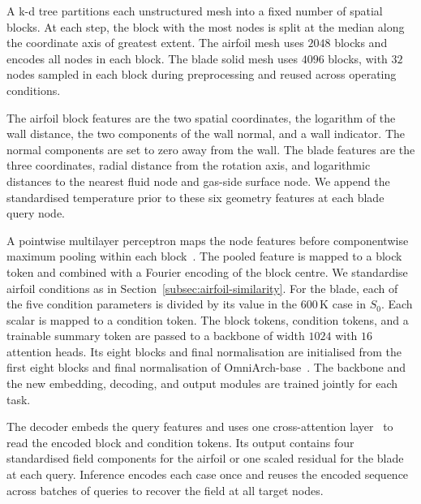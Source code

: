 \documentclass[a4paper,fleqn]{cas-sc}
\begin{document}
A k-d tree partitions each unstructured mesh into a fixed number of spatial blocks.
At each step, the block with the most nodes is split at the median along the coordinate
axis of greatest extent. The airfoil mesh uses $2048$ blocks and encodes all nodes
in each block. The blade solid mesh uses $4096$ blocks, with $32$ nodes sampled in each
block during preprocessing and reused across operating conditions.

The airfoil block features are the two spatial coordinates, the logarithm of the wall
distance, the two components of the wall normal, and a wall indicator. The normal
components are set to zero away from the wall. The blade features are the three
coordinates, radial distance from the rotation axis, and logarithmic distances to
the nearest fluid node and gas-side surface node. We append the standardised
temperature prior to these six geometry features at each blade query node.

A pointwise multilayer perceptron maps the node features before componentwise maximum
pooling within each block~\citep{Qi2017PointNet}. The pooled feature is mapped to a block token and combined
with a Fourier encoding of the block centre. We standardise airfoil conditions as in
Section~\ref{subsec:airfoil-similarity}. For the blade, each of the five condition
parameters is divided by its value in the $600\,\mathrm{K}$ case in $S_0$. Each scalar
is mapped to a condition token. The block tokens, condition tokens, and a trainable
summary token are passed to a backbone of width $1024$ with $16$ attention heads.
Its eight blocks and final normalisation are initialised from the first eight blocks
and final normalisation of OmniArch-base~\citep{Chen2025OmniArch}. The backbone and the new embedding,
decoding, and output modules are trained jointly for each task.

The decoder embeds the query features and uses one cross-attention layer~\citep{Vaswani2017} to read the
encoded block and condition tokens. Its output contains four standardised field
components for the airfoil or one scaled residual for the blade at each query.
Inference encodes each case once and reuses the encoded sequence across batches of
queries to recover the field at all target nodes.
\end{document}
